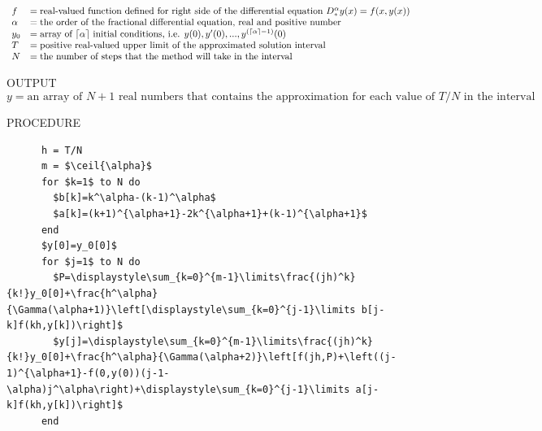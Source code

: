         \begin{equation*}
        	\begin{array}{ll}
        		f &= \text{real-valued function defined for right side of the differential equation $D_*^\alpha y(x) = f(x,y(x))$}\\
                \alpha &= \text{the order of the fractional differential equation, real and positive number}\\
                y_0 &= \text{array of $\lceil\alpha\rceil$ initial conditions, i.e. $y(0),y'(0),...,y^{(\lceil\alpha\rceil-1)}(0)$}\\
                T &= \text{positive real-valued upper limit of the approximated solution interval}\\
                N &= \text{the number of steps that the method will take in the interval}\\ 
        	\end{array}
        \end{equation*}
        
        OUTPUT        
        \begin{equation*}
        	y = \text{an array of $N+1$ real numbers that contains the approximation for each value of $T/N$ in the interval}
        \end{equation*}
        
        
        PROCEDURE
        \begin{lstlisting}
      h = T/N
      m = $\ceil{\alpha}$
      for $k=1$ to N do
      	$b[k]=k^\alpha-(k-1)^\alpha$
        $a[k]=(k+1)^{\alpha+1}-2k^{\alpha+1}+(k-1)^{\alpha+1}$
      end
      $y[0]=y_0[0]$
      for $j=1$ to N do
      	$P=\displaystyle\sum_{k=0}^{m-1}\limits\frac{(jh)^k}{k!}y_0[0]+\frac{h^\alpha}{\Gamma(\alpha+1)}\left[\displaystyle\sum_{k=0}^{j-1}\limits b[j-k]f(kh,y[k])\right]$
        $y[j]=\displaystyle\sum_{k=0}^{m-1}\limits\frac{(jh)^k}{k!}y_0[0]+\frac{h^\alpha}{\Gamma(\alpha+2)}\left[f(jh,P)+\left((j-1)^{\alpha+1}-f(0,y(0))(j-1-\alpha)j^\alpha\right)+\displaystyle\sum_{k=0}^{j-1}\limits a[j-k]f(kh,y[k])\right]$
      end
        \end{lstlisting}

